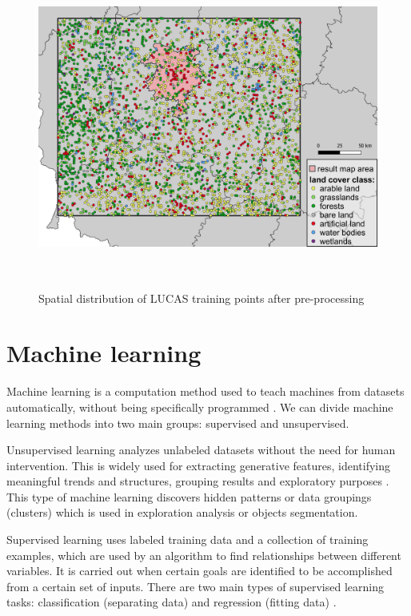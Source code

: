 \documentclass{amuthesis}
\begin{document}
\begin{figure}[H]

{\centering \includegraphics[width=5.875in,height=4.16667in]{./figures/lucas_distribution.png}

}

\caption{\label{fig-rycina4}Spatial distribution of LUCAS training
points after pre-processing}

\end{figure}

\hypertarget{sec-ml}{%
\section{Machine learning}\label{sec-ml}}

Machine learning is a computation method used to teach machines from
datasets automatically, without being specifically programmed
\autocite{mahesh_machine_2018,sarker_machine_2021}. We can divide
machine learning methods into two main groups: supervised and
unsupervised.

Unsupervised learning analyzes unlabeled datasets without the need for
human intervention. This is widely used for extracting generative
features, identifying meaningful trends and structures, grouping results
and exploratory purposes \autocite{sarker_machine_2021}. This type of
machine learning discovers hidden patterns or data groupings (clusters)
which is used in exploration analysis or objects segmentation.

Supervised learning uses labeled training data and a collection of
training examples, which are used by an algorithm to find relationships
between different variables. It is carried out when certain goals are
identified to be accomplished from a certain set of inputs. There are
two main types of supervised learning tasks: classification (separating
data) and regression (fitting data) \autocite{sarker_machine_2021}.
\end{document}
